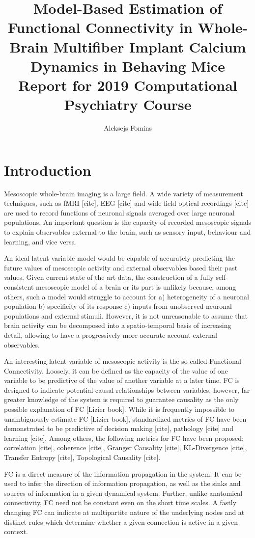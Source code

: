 \documentclass[a4paper,10pt]{article}
\title{
  Model-Based Estimation of Functional Connectivity in Whole-Brain Multifiber Implant Calcium Dynamics in Behaving Mice\\
  \vspace{10pt}
  \small Report for 2019 Computational Psychiatry Course}
\author{Aleksejs Fomins}
\begin{document}
\maketitle

\section{Introduction}
Mesoscopic whole-brain imaging is a large field. A wide variety of measurement techniques, such as fMRI [cite], EEG [cite] and wide-field optical recordings [cite] are used to record functions of neuronal signals averaged over large neuronal populations. An important question is the capacity of recorded mesoscopic signals to explain observables external to the brain, such as sensory input, behaviour and learning, and vice versa.

An ideal latent variable model would be capable of accurately predicting the future values of mesoscopic activity and external observables based their past values. Given current state of the art data, the construction of a fully self-consistent mesoscopic model of a brain or its part is unlikely because, among others, such a model would struggle to account for a) heterogeneity of a neuronal population b) specificity of its response c) inputs from unobserved neuronal populations and external stimuli. However, it is not unreasonable to assume that brain activity can be decomposed into a spatio-temporal basis of increasing detail, allowing to have a progressively more accurate account external observables.

An interesting latent variable of mesoscopic activity is the so-called Functional Connectivity. Loosely, it can be defined as the capacity of the value of one variable to be predictive of the value of another variable at a later time. FC is designed to indicate potential causal relationships between variables, however, far greater knowledge of the system is required to guarantee causality as the only possible explanation of FC [Lizier book]. While it is frequently impossible to unambiguously estimate FC [Lizier book], standardized metrics of FC have been demonstrated to be predictive of decision making \cite{lizier2010} [cite], pathology [cite] and learning [cite]. Among others, the following metrics for FC have been proposed: correlation [cite], coherence [cite], Granger Causality [cite], KL-Divergence [cite], Transfer Entropy [cite], Topological Causality [cite].

FC is a direct measure of the information propagation in the system. It can be used to infer the direction of information propagation, as well as the sinks and sources of information in a given dynamical system. Further, unlike anatomical connectivity, FC need not be constant even on the short time scales. A fastly changing FC can indicate at multipartite nature of the underlying nodes and at distinct rules which determine whether a given connection is active in a given context.
\end{document}
